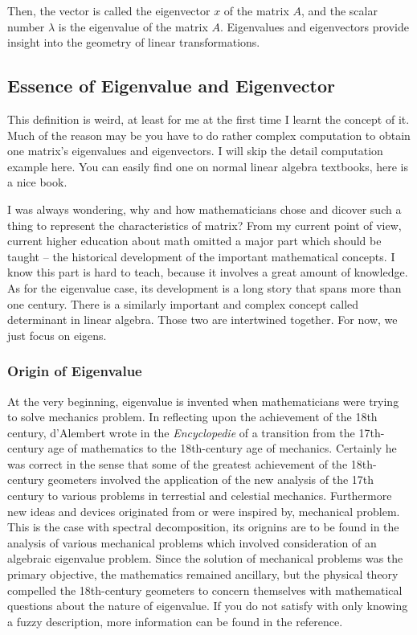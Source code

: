 \documentclass[a4paper]{book}
\begin{document}
    Then, the vector is called the eigenvector $x$ of the matrix $A$,
    and the scalar number $\lambda$ is the eigenvalue of the matrix $A$.
    Eigenvalues and eigenvectors provide insight into the geometry of
    linear transformations.

    \subsection{Essence of Eigenvalue and Eigenvector}

    This definition is weird, at least for me at the first time I learnt the
    concept of it. Much of the reason may be you have to do rather complex
    computation to obtain one matrix's eigenvalues and eigenvectors. I will
    skip the detail computation example here. You can easily find one on
    normal linear algebra textbooks, here\cite{strang2009introduction} is a
    nice book.

    I was always wondering, why and how mathematicians chose and dicover
    such a thing to represent the characteristics of matrix? From my current
    point of view, current higher education about math omitted a major part
    which should be taught -- the historical development of the important
    mathematical concepts. I know this part is hard to teach, because it
    involves a great amount of knowledge. As for the eigenvalue case,
    its development is a long story that spans more than one century.
    There is a similarly important and complex concept called
    determinant in linear algebra. Those two are intertwined together.
    For now, we just focus on eigens.

      \subsubsection{Origin of Eigenvalue}

      At the very beginning, eigenvalue is invented when mathematicians
      were trying to solve mechanics problem. In reflecting upon the
      achievement of the 18th century, d'Alembert wrote in the
      \textit{Encyclopedie} of a transition from the 17th-century age of
      mathematics to the 18th-century age of mechanics. Certainly he was
      correct in the sense that some of the greatest achievement of the
      18th-century geometers involved the application of the new
      analysis of the 17th century to various problems in terrestial and
      celestial mechanics. Furthermore new ideas and devices originated
      from or were inspired by, mechanical problem. This is the case
      with spectral decomposition, its orignins are to be found in the analysis
      of various mechanical problems which involved consideration of an
      algebraic eigenvalue problem. Since the solution of mechanical
      problems was the primary objective, the mathematics remained
      ancillary, but the physical theory compelled the 18th-century
      geometers to concern themselves with mathematical questions about
      the nature of eigenvalue.\cite{Hawkins19751} If you do not satisfy
      with only knowing a fuzzy description, more information can be
      found in the reference\cite{Hawkins19751}.
\end{document}
